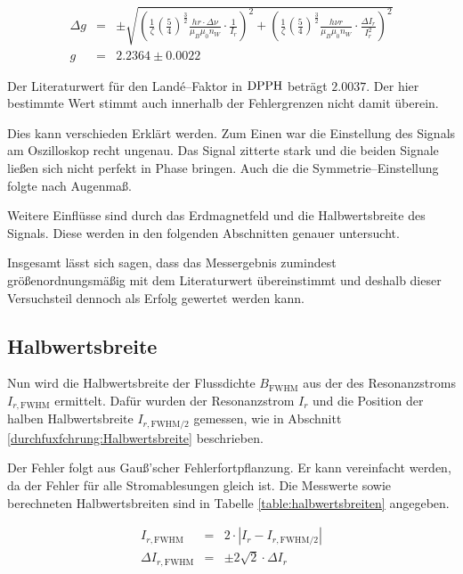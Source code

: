 \documentclass[12pt,a4paper]{scrartcl}
\numberwithin{equation}{section} %
\begin{document}
\begin{eqnarray}
	\Delta g &=&
		\pm\sqrt{
			\left(\frac{1}{\zeta} \left(\frac{5}{4}\right)^{\frac{3}{2}} \frac{h r \cdot \Delta \nu}{\mu_B \mu_0 n_W} \cdot  \frac{1}{I_r}\right)^2 + \left(\frac{1}{\zeta} \left(\frac{5}{4}\right)^{\frac{3}{2}} \frac{h \nu r}{\mu_B \mu_0 n_W} \cdot \frac{\Delta I_r}{I_r^2}\right)^2
		} \\
	g &=& 2.2364 \pm 0.0022
\end{eqnarray}

\noindent
Der Literaturwert für den Landé--Faktor in $\ce{DPPH}$ beträgt $2.0037$. \cite{Uni} Der hier bestimmte Wert stimmt auch innerhalb der Fehlergrenzen nicht damit überein.

Dies kann verschieden Erklärt werden. Zum Einen war die Einstellung des Signals am Oszilloskop recht ungenau. Das Signal zitterte stark und die beiden Signale ließen sich nicht perfekt in Phase bringen. Auch die die Symmetrie--Einstellung folgte nach Augenmaß.

Weitere Einflüsse sind durch das Erdmagnetfeld und die Halbwertsbreite des Signals. Diese werden in den folgenden Abschnitten genauer untersucht.

Insgesamt lässt sich sagen, dass das Messergebnis zumindest größenordnungsmäßig mit dem Literaturwert übereinstimmt und deshalb dieser Versuchsteil dennoch als Erfolg gewertet werden kann.

\subsection{Halbwertsbreite}
\label{auswertung:Halbwertsbreite}

Nun wird die Halbwertsbreite der Flussdichte $B_\mathrm{FWHM}$ aus der des Resonanzstroms $I_{r,\mathrm{FWHM}}$ ermittelt. Dafür wurden der Resonanzstrom $I_r$ und die Position der halben Halbwertsbreite $I_{r,\mathrm{FWHM}/2}$ gemessen, wie in Abschnitt \ref{durchfuxfchrung:Halbwertsbreite} beschrieben.

Der Fehler folgt aus Gauß'scher Fehlerfortpflanzung. Er kann vereinfacht werden, da der Fehler für alle Stromablesungen gleich ist. Die Messwerte sowie berechneten Halbwertsbreiten sind in Tabelle \ref{table:halbwertsbreiten} angegeben.

\begin{eqnarray}
	I_{r,\mathrm{FWHM}} &=& 2\cdot\left|I_r-I_{r,\mathrm{FWHM}/2}\right| \\
	\Delta I_{r,\mathrm{FWHM}} &=& \pm2\sqrt{2} \cdot \Delta I_r
\end{eqnarray}
\end{document}

